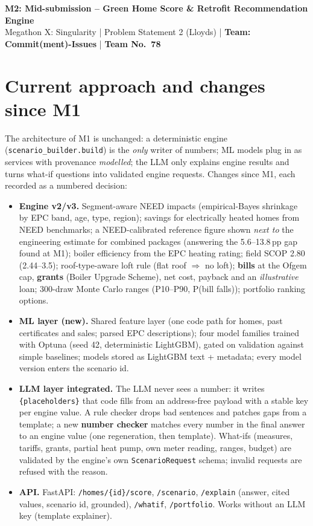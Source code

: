 \documentclass[10pt,a4paper]{article}
\begin{document}
\begin{center}
{\Large\bfseries M2: Mid-submission -- Green Home Score \& Retrofit Recommendation Engine}\\[3pt]
Megathon X: Singularity \;|\; Problem Statement 2 (Lloyds) \;|\; \textbf{Team: Commit(ment)-Issues} \;|\; \textbf{Team No.\ 78}
\end{center}
\vspace{-8pt}

\section{Current approach and changes since M1}
The architecture of M1 is unchanged: a deterministic engine (\texttt{scenario\_builder.build}) is the \emph{only}
writer of numbers; ML models plug in as services with provenance \emph{modelled}; the LLM only explains engine results
and turns what-if questions into validated engine requests. Changes since M1, each recorded as a numbered decision:
\begin{itemize}
\item \textbf{Engine v2/v3.} Segment-aware NEED impacts (empirical-Bayes shrinkage by EPC band, age, type, region);
savings for electrically heated homes from NEED benchmarks; a NEED-calibrated reference figure shown \emph{next to}
the engineering estimate for combined packages (answering the 5.6--13.8\,pp gap found at M1); boiler efficiency from the
EPC heating rating; field SCOP 2.80 (2.44--3.5); roof-type-aware loft rule (flat roof $\Rightarrow$ no loft);
\textbf{bills} at the Ofgem cap, \textbf{grants} (Boiler Upgrade Scheme), net cost, payback and an
\emph{illustrative} loan; 300-draw Monte Carlo ranges (P10--P90, P(bill falls)); portfolio ranking options.
\item \textbf{ML layer (new).} Shared feature layer (one code path for homes, past certificates and sales; parsed EPC
descriptions); four model families trained with Optuna (seed 42, deterministic LightGBM), gated on validation against
simple baselines; models stored as LightGBM text + metadata; every model version enters the scenario id.
\item \textbf{LLM layer integrated.} The LLM never sees a number: it writes \texttt{\{placeholders\}} that code fills
from an address-free payload with a stable key per engine value. A rule checker drops bad sentences and patches gaps from
a template; a new \textbf{number checker} matches every number in the final answer to an engine value (one regeneration,
then template). What-ifs (measures, tariffs, grants, partial heat pump, own meter reading, ranges, budget) are validated
by the engine's own \texttt{ScenarioRequest} schema; invalid requests are refused with the reason.
\item \textbf{API.} FastAPI: \texttt{/homes/\{id\}/score}, \texttt{/scenario}, \texttt{/explain} (answer, cited values,
scenario id, grounded), \texttt{/whatif}, \texttt{/portfolio}. Works without an LLM key (template explainer).
\end{itemize}
\end{document}
